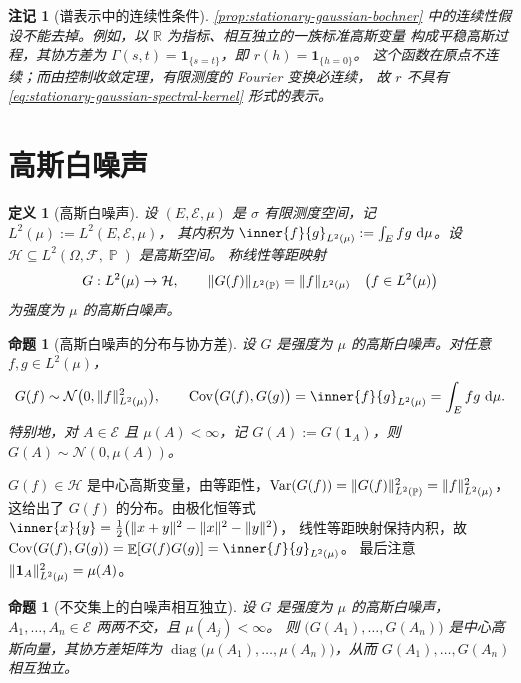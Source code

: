 \documentclass[UTF8,11pt,a4paper,oneside,fontset=fandol]{ctexrep}
\makeatletter
\numberwithin{equation}{section}
\theoremstyle{zhthm}
\newtheorem{proposition}[theorem]{命题}
\newtheorem{definition}[theorem]{定义}
\newtheorem{remark}[theorem]{注记}
\renewenvironment{proof}[1][\proofname]{\par
  \pushQED{\qed}%
  \normalfont\topsep6\p@\@plus6\p@\relax
  \trivlist
  \item[\hskip\labelsep\bfseries#1\hspace{0.5em}]\ignorespaces
}{%
  \popQED\endtrivlist\@endpefalse
}
\renewcommand{\proofname}{证明}
\newcommand{\R}{\mathbb{R}}
\newcommand{\F}{\mathcal{F}}
\newcommand{\Hcal}{\mathcal{H}}
\DeclareMathOperator{\Prob}{\mathbb{P}}
\DeclareMathOperator{\E}{\mathbb{E}}
\DeclareMathOperator{\Var}{Var}
\DeclareMathOperator{\Cov}{Cov}
\DeclareMathOperator{\diag}{diag}
\newcommand{\Normal}{\mathcal{N}}
\newcommand{\ind}[1]{\mathbf{1}_{#1}}
\newcommand{\dd}{\mathop{}\!\mathrm{d}}
\DeclarePairedDelimiter{\norm}{\lVert}{\rVert}
\makeatother
\begin{document}
\begin{remark}[谱表示中的连续性条件]
\label{rem:bochner-continuity-needed}
\cref{prop:stationary-gaussian-bochner} 中的连续性假设不能去掉。例如，以 $\R$ 为指标、相互独立的一族标准高斯变量
构成平稳高斯过程，其协方差为 $\Gamma(s,t)=\ind{\{s=t\}}$，即 $r(h)=\ind{\{h=0\}}$。
这个函数在原点不连续；而由控制收敛定理，有限测度的 Fourier 变换必连续，
故 $r$ 不具有\cref{eq:stationary-gaussian-spectral-kernel} 形式的表示。
\end{remark}

\section{高斯白噪声}
\label{sec:gaussian-white-noise}

\begin{definition}[高斯白噪声]
\label{def:gaussian-white-noise}
设 $(E,\mathcal{E},\mu)$ 是 $\sigma$ 有限测度空间，记 $L^2(\mu):=L^2(E,\mathcal{E},\mu)$，
其内积为 $\inner{f}{g}_{L^2(\mu)}:=\int_Efg\,\dd\mu$。设 $\Hcal\subseteq L^2(\Omega,\F,\Prob)$ 是高斯空间。
称线性等距映射
\[
  G:L^2(\mu)\to\Hcal,\qquad \norm{G(f)}_{L^2(\Prob)}=\norm{f}_{L^2(\mu)}\quad\bigl(f\in L^2(\mu)\bigr)
\]
为强度为 $\mu$ 的高斯白噪声。
\end{definition}

\begin{proposition}[高斯白噪声的分布与协方差]
\label{prop:gaussian-white-noise-covariance}
设 $G$ 是强度为 $\mu$ 的高斯白噪声。对任意 $f,g\in L^2(\mu)$，
\[
  G(f)\sim\Normal\bigl(0,\norm{f}_{L^2(\mu)}^2\bigr),\qquad
  \Cov\bigl(G(f),G(g)\bigr)=\inner{f}{g}_{L^2(\mu)}=\int_Efg\,\dd\mu.
\]
特别地，对 $A\in\mathcal{E}$ 且 $\mu(A)<\infty$，记 $G(A):=G(\ind{A})$，则 $G(A)\sim\Normal(0,\mu(A))$。
\end{proposition}

\begin{proof}
$G(f)\in\Hcal$ 是中心高斯变量，由等距性，$\Var(G(f))=\norm{G(f)}_{L^2(\Prob)}^2=\norm{f}_{L^2(\mu)}^2$，
这给出了 $G(f)$ 的分布。由极化恒等式 $\inner{x}{y}=\frac12\bigl(\norm{x+y}^2-\norm{x}^2-\norm{y}^2\bigr)$，
线性等距映射保持内积，故 $\Cov(G(f),G(g))=\E[G(f)G(g)]=\inner{f}{g}_{L^2(\mu)}$。
最后注意 $\norm{\ind{A}}_{L^2(\mu)}^2=\mu(A)$。
\end{proof}

\begin{proposition}[不交集上的白噪声相互独立]
\label{prop:gaussian-white-noise-disjoint-independence}
设 $G$ 是强度为 $\mu$ 的高斯白噪声，$A_1,\ldots,A_n\in\mathcal{E}$ 两两不交，且 $\mu(A_j)<\infty$。
则 $\bigl(G(A_1),\ldots,G(A_n)\bigr)$ 是中心高斯向量，其协方差矩阵为
$\diag\bigl(\mu(A_1),\ldots,\mu(A_n)\bigr)$，从而 $G(A_1),\ldots,G(A_n)$ 相互独立。
\end{proposition}
\end{document}
